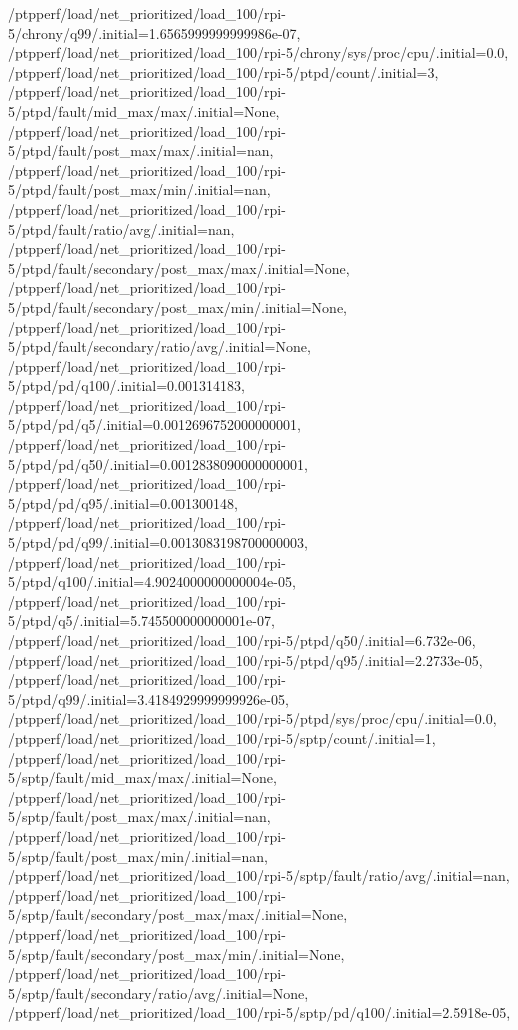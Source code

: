 {    /ptpperf/load/net_prioritized/load_100/rpi-5/chrony/q99/.initial=1.6565999999999986e-07,
    /ptpperf/load/net_prioritized/load_100/rpi-5/chrony/sys/proc/cpu/.initial=0.0,
    /ptpperf/load/net_prioritized/load_100/rpi-5/ptpd/count/.initial=3,
    /ptpperf/load/net_prioritized/load_100/rpi-5/ptpd/fault/mid_max/max/.initial=None,
    /ptpperf/load/net_prioritized/load_100/rpi-5/ptpd/fault/post_max/max/.initial=nan,
    /ptpperf/load/net_prioritized/load_100/rpi-5/ptpd/fault/post_max/min/.initial=nan,
    /ptpperf/load/net_prioritized/load_100/rpi-5/ptpd/fault/ratio/avg/.initial=nan,
    /ptpperf/load/net_prioritized/load_100/rpi-5/ptpd/fault/secondary/post_max/max/.initial=None,
    /ptpperf/load/net_prioritized/load_100/rpi-5/ptpd/fault/secondary/post_max/min/.initial=None,
    /ptpperf/load/net_prioritized/load_100/rpi-5/ptpd/fault/secondary/ratio/avg/.initial=None,
    /ptpperf/load/net_prioritized/load_100/rpi-5/ptpd/pd/q100/.initial=0.001314183,
    /ptpperf/load/net_prioritized/load_100/rpi-5/ptpd/pd/q5/.initial=0.0012696752000000001,
    /ptpperf/load/net_prioritized/load_100/rpi-5/ptpd/pd/q50/.initial=0.0012838090000000001,
    /ptpperf/load/net_prioritized/load_100/rpi-5/ptpd/pd/q95/.initial=0.001300148,
    /ptpperf/load/net_prioritized/load_100/rpi-5/ptpd/pd/q99/.initial=0.0013083198700000003,
    /ptpperf/load/net_prioritized/load_100/rpi-5/ptpd/q100/.initial=4.9024000000000004e-05,
    /ptpperf/load/net_prioritized/load_100/rpi-5/ptpd/q5/.initial=5.745500000000001e-07,
    /ptpperf/load/net_prioritized/load_100/rpi-5/ptpd/q50/.initial=6.732e-06,
    /ptpperf/load/net_prioritized/load_100/rpi-5/ptpd/q95/.initial=2.2733e-05,
    /ptpperf/load/net_prioritized/load_100/rpi-5/ptpd/q99/.initial=3.4184929999999926e-05,
    /ptpperf/load/net_prioritized/load_100/rpi-5/ptpd/sys/proc/cpu/.initial=0.0,
    /ptpperf/load/net_prioritized/load_100/rpi-5/sptp/count/.initial=1,
    /ptpperf/load/net_prioritized/load_100/rpi-5/sptp/fault/mid_max/max/.initial=None,
    /ptpperf/load/net_prioritized/load_100/rpi-5/sptp/fault/post_max/max/.initial=nan,
    /ptpperf/load/net_prioritized/load_100/rpi-5/sptp/fault/post_max/min/.initial=nan,
    /ptpperf/load/net_prioritized/load_100/rpi-5/sptp/fault/ratio/avg/.initial=nan,
    /ptpperf/load/net_prioritized/load_100/rpi-5/sptp/fault/secondary/post_max/max/.initial=None,
    /ptpperf/load/net_prioritized/load_100/rpi-5/sptp/fault/secondary/post_max/min/.initial=None,
    /ptpperf/load/net_prioritized/load_100/rpi-5/sptp/fault/secondary/ratio/avg/.initial=None,
    /ptpperf/load/net_prioritized/load_100/rpi-5/sptp/pd/q100/.initial=2.5918e-05,
}
